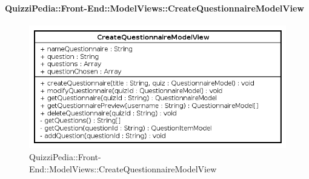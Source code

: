 \paragraph[QuizziPedia::Front-End::ModelViews\\::CreateQuestionnaireModelView]{QuizziPedia::Front-End::ModelViews::CreateQuestionnaireModelView}
	
	\label{QuizziPedia::Front-End::ModelViews::CreateQuestionnaireModelView}
	
	\begin{figure}[ht]
		\centering
		\includegraphics[scale=0.5,keepaspectratio]{UML/Classi/Front-End/QuizziPedia_Front-end_ModelView_CreateQuestionnaireModelView.png}
		\caption{QuizziPedia::Front-End::ModelViews::CreateQuestionnaireModelView}
	\end{figure} \FloatBarrier
	
